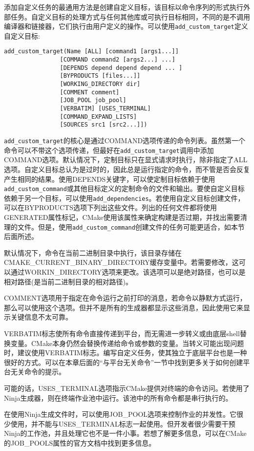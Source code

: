 


添加自定义任务的最通用方法是创建自定义目标，该目标以命令序列的形式执行外部任务。自定义目标的处理方式与任何其他库或可执行目标相同，不同的是不调用编译器和链接器，它们执行由用户定义的操作。可以使用\texttt{add\_custom\_target}定义自定义目标:

\begin{lstlisting}[style=styleCMake]
add_custom_target(Name [ALL] [command1 [args1...]]
				[COMMAND command2 [args2...] ...]
				[DEPENDS depend depend depend ... ]
				[BYPRODUCTS [files...]]
				[WORKING_DIRECTORY dir]
				[COMMENT comment]
				[JOB_POOL job_pool]
				[VERBATIM] [USES_TERMINAL]
				[COMMAND_EXPAND_LISTS]
				[SOURCES src1 [src2...]])
\end{lstlisting}

\texttt{add\_custom\_target}的核心是通过COMMAND选项传递的命令列表。虽然第一个命令可以不带这个选项传递，但最好在\texttt{add\_custom\_target}调用中添加COMMAND选项。默认情况下，定制目标只在显式请求时执行，除非指定了ALL选项。自定义目标总认为是过时的，因此总是运行指定的命令，而不管是否会反复产生相同的结果。使用DEPENDS关键字，可以使定制目标依赖于使用\texttt{add\_custom\_command}或其他目标定义的定制命令的文件和输出。要使自定义目标依赖于另一个目标，可以使用\texttt{add\_dependencies}。若使用自定义目标创建文件，可以在BYPRODUCTS选项下列出这些文件。列出的任何文件都将使用GENERATED属性标记，CMake使用该属性来确定构建是否过期，并找出需要清理的文件。但是，使用\texttt{add\_custom\_command}创建文件的任务可能更适合，如本节后面所述。

默认情况下，命令在当前二进制目录中执行，该目录存储在CMAKE\_CURRENT\_BINARY\_DIRECTORY缓存变量中。若需要修改，这可以通过WORKIN\_DIRECTORY选项来更改。该选项可以是绝对路径，也可以是相对路径(是当前二进制目录的相对路径)。

COMMENT选项用于指定在命令运行之前打印的消息，若命令以静默方式运行，那么可以使用这个选项。但并不是所有的生成器都显示这些消息，因此使用它来显示关键信息不太可靠。

VERBATIM标志使所有命令直接传递到平台，而无需进一步转义或由底层shell替换变量。CMake本身仍然会替换传递给命令或参数的变量。当转义可能出现问题时，建议使用VERBATIM标志。编写自定义任务，使其独立于底层平台也是一种很好的方式。可以在本章后面的“与平台无关命令”一节中找到更多关于如何创建平台无关命令的提示。

可能的话，USES\_TERMINAL选项指示CMake提供对终端的命令访问。若使用了Ninja生成器，则在终端作业池中运行。该池中的所有命令都是串行执行的。

在使用Ninja生成文件时，可以使用JOB\_POOL选项来控制作业的并发性。它很少使用，并不能与USES\_TERMINAL标志一起使用。但开发者很少需要干预Ninja的工作池，并且处理它也不是一件小事。若想了解更多信息，可以在CMake的JOB\_POOLS属性的官方文档中找到更多信息。

